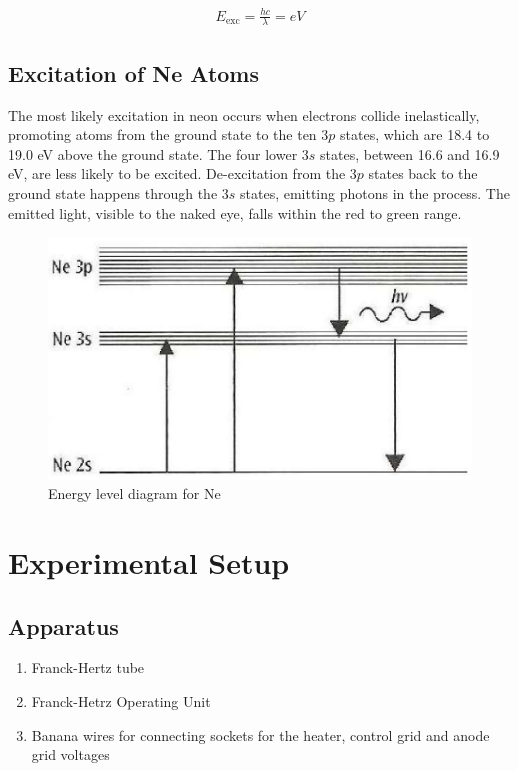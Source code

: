 \begin{align}
    E_\text{exc} = \frac{hc}{\lambda} = eV
\end{align}

\subsection*{Excitation of Ne Atoms}
The most likely excitation in neon occurs when electrons collide inelastically, promoting atoms from the ground state to the ten $3p$ states, which are 18.4 to 19.0 eV above the ground state. The four lower $3s$ states, between 16.6 and 16.9 eV, are less likely to be excited. De-excitation from the $3p$ states back to the ground state happens through the $3s$ states, emitting photons in the process. The emitted light, visible to the naked eye, falls within the red to green range.

\begin{figure}[H]
    \centering
    \includegraphics[width=0.8\columnwidth]{images/f1.png}
    \caption{Energy level diagram for Ne}
\end{figure}

\section{Experimental Setup}

\subsection*{Apparatus}

\begin{enumerate}
    \item Franck-Hertz tube
    \item Franck-Hetrz Operating Unit
    \item Banana wires for connecting sockets for the heater, control grid and anode grid voltages\\
\end{enumerate}


